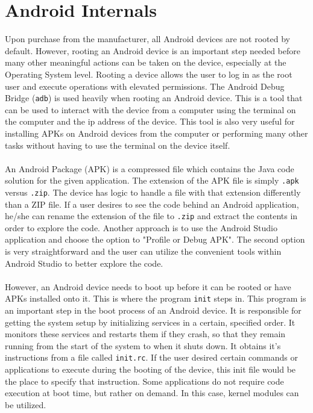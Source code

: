 \section{Android Internals}
\label{androidinternals}
Upon purchase from the manufacturer, all Android devices are not rooted by default. However, rooting an Android device is an important step needed before many other meaningful actions can be taken on the device, especially at the Operating System level. Rooting a device allows the user to log in as the root user and execute operations with elevated permissions. The Android Debug Bridge (\verb|adb|) is used heavily when rooting an Android device. This is a tool that can be used to interact with the device from a computer using the terminal on the computer and the ip address of the device. This tool is also very useful for installing APKs on Android devices from the computer or performing many other tasks without having to use the terminal on the device itself. \\ \\
An Android Package (APK) is a compressed file which contains the Java code solution for the given application. The extension of the APK file is simply \verb|.apk| versus \verb|.zip|. The device has logic to handle a file with that extension differently than a ZIP file. If a user desires to see the code behind an Android application, he/she can rename the extension of the file to \verb|.zip| and extract the contents in order to explore the code. Another approach is to use the Android Studio application and choose the option to "Profile or Debug APK". The second option is very straightforward and the user can utilize the convenient tools within Android Studio to better explore the code. \\ \\
However, an Android device needs to boot up before it can be rooted or have APKs installed onto it. This is where the program \verb|init| steps in. This program is an important step in the boot process of an Android device. It is responsible for getting the system setup by initializing services in a certain, specified order. It monitors these services and restarts them if they crash, so that they remain running from the start of the system to when it shuts down. It obtains it's instructions from a file called \verb|init.rc|. If the user desired certain commands or applications to execute during the booting of the device, this init file would be the place to specify that instruction. Some applications do not require code execution at boot time, but rather on demand. In this case, kernel modules can be utilized. \cite{pmatetinotes}
